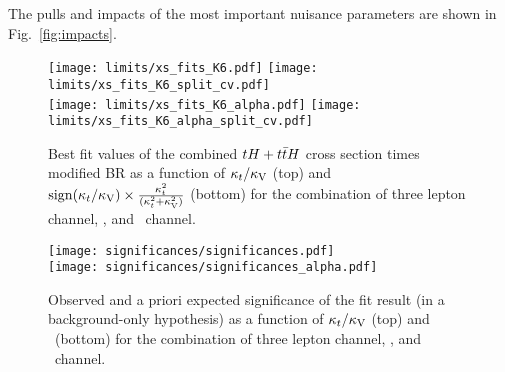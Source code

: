 
The pulls and impacts of the most important nuisance parameters are shown in Fig.~\ref{fig:impacts}.


\begin{figure} [!h]
 \centering
 \texttt{[image: limits/xs\_fits\_K6.pdf]}
 \texttt{[image: limits/xs\_fits\_K6\_split\_cv.pdf]}\\
 \texttt{[image: limits/xs\_fits\_K6\_alpha.pdf]}
 \texttt{[image: limits/xs\_fits\_K6\_alpha\_split\_cv.pdf]}
\caption{Best fit values of the combined $tH+t\bar{t}H$ cross section times modified BR as a function of $\kappa_t/\kappa_\text{V}$ (top) and $\mathrm{sign}(\kappa_t/\kappa_\text{V})\times\frac{\kappa_t^2}{(\kappa_t^2+\kappa_\text{V}^2)}$ (bottom) for the combination of three lepton channel, \mumu, and \emu\ channel.}
\label{fig:xs_fits_cv}
\end{figure}


\begin{figure} [!h]
 \centering
 \texttt{[image: significances/significances.pdf]} \\
 \texttt{[image: significances/significances\_alpha.pdf]}
\caption{Observed and a priori expected significance of the fit result (in a background-only hypothesis) as a function of $\kappa_t/\kappa_\text{V}$ (top) and \ft\ (bottom) for the combination of three lepton channel, \mumu, and \emu\ channel.}
\label{fig:significances}
\end{figure}


